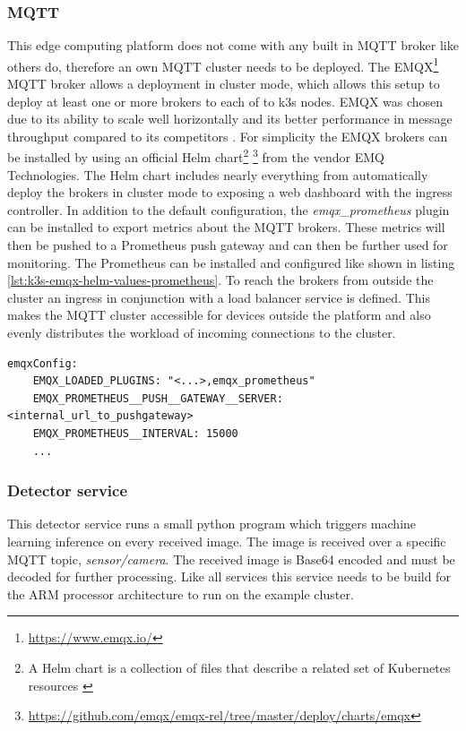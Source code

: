 \subsubsection*{MQTT}\label{subsubsec:k3s-mqtt}
This edge computing platform does not come with any built in MQTT broker like others do, therefore an own MQTT cluster needs to be deployed. The EMQX\footnote{\url{https://www.emqx.io/}} \gls{MQTT} broker allows a deployment in cluster mode, which allows this setup to deploy at least one or more brokers to each of to k3s nodes. EMQX was chosen due to its ability to scale well horizontally and its better performance in message throughput compared to its competitors \cite{Koziolek2020}. For simplicity the EMQX brokers can be installed by using an official Helm chart\footnote{A Helm chart is a collection of files that describe a related set of Kubernetes resources \cite{HelmAuthorsCharts}} \footnote{\url{https://github.com/emqx/emqx-rel/tree/master/deploy/charts/emqx}} from the vendor EMQ Technologies. The Helm chart includes nearly everything from automatically deploy the brokers in cluster mode to exposing a web dashboard with the ingress controller. In addition to the default configuration, the \textit{emqx\_prometheus} plugin can be installed to export metrics about the \gls{MQTT} brokers. These metrics will then be pushed to a Prometheus push gateway and can then be further used for monitoring. The Prometheus can be installed and configured like shown in listing \ref{lst:k3s-emqx-helm-values-prometheus}. To reach the brokers from outside the cluster an ingress in conjunction with a load balancer service is defined. This makes the MQTT cluster accessible for devices outside the platform and also evenly distributes the workload of incoming connections to the cluster.

\begin{lstlisting}[caption={Build emergency container image for ARM with Jib.},label={lst:k3s-emqx-helm-values-prometheus},captionpos=b]
emqxConfig:
    EMQX_LOADED_PLUGINS: "<...>,emqx_prometheus"
    EMQX_PROMETHEUS__PUSH__GATEWAY__SERVER: <internal_url_to_pushgateway>
    EMQX_PROMETHEUS__INTERVAL: 15000
    ...
\end{lstlisting}

\newpage
\subsubsection*{Detector service}\label{subsubsec:k3s-detector}
This detector service runs a small python program which triggers machine learning inference on every received image. The image is received over a specific MQTT topic, \textit{sensor/camera}. The received image is Base64 encoded and must be decoded for further processing. Like all services this service needs to be build for the ARM processor architecture to run on the example cluster.

